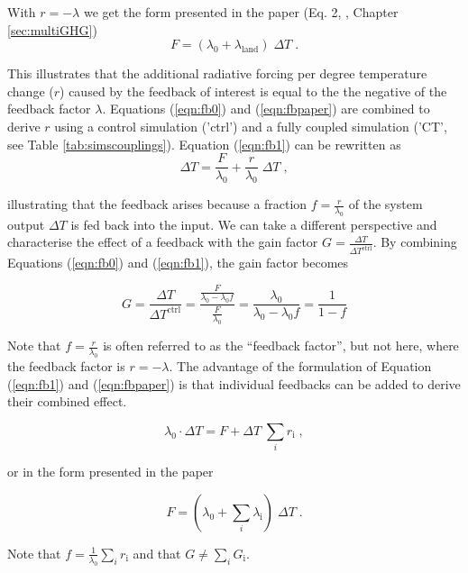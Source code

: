 With $r=-\lambda$ we get the form presented in the paper (Eq. 2, \citep{stocker13natcc}, Chapter \ref{sec:multiGHG})
\begin{equation}
  F = ( \lambda_0 + \lambda_{\text{land}}) \; \Delta T \;.
 \label{eqn:fbpaper}
 \end{equation}

This illustrates that the additional radiative forcing per degree temperature change ($r$) caused by the feedback of interest is equal to the the negative of the feedback factor $\lambda$. Equations (\ref{eqn:fb0}) and (\ref{eqn:fbpaper}) are combined to derive  $r$ using a control simulation ('ctrl') and a fully coupled simulation ('CT', see Table \ref{tab:simscouplings}). Equation (\ref{eqn:fb1}) can be rewritten as
 \begin{equation}
   \Delta T = \frac{F}{\lambda_0} + \frac{r}{\lambda_0}\;\Delta T\;,
 \end{equation}

illustrating that the feedback arises because a fraction $f=\frac{r}{\lambda_0}$ of the system output $\Delta T$ is fed back into the input. We can take a different perspective and characterise the effect of a feedback with the gain factor $G=\frac{\Delta T}{\Delta T^{\text{ctrl}}}$. By combining Equations (\ref{eqn:fb0}) and (\ref{eqn:fb1}), the gain factor becomes

 \begin{equation} 
   G=\frac{\Delta T}{\Delta T^{\text{ctrl}}} = \frac{\frac{F}{\lambda_0-\lambda_0f}}{\frac{F}{\lambda_0}} = \frac{\lambda_0}{\lambda_0-\lambda_0f} = \frac{1}{1-f} 
 \end{equation}

Note that $f=\frac{r}{\lambda_0}$ is often referred to as the ``feedback factor'', but not here, where the feedback factor is $r = -\lambda$. The advantage of the formulation of Equation (\ref{eqn:fb1}) and (\ref{eqn:fbpaper}) is that individual feedbacks can be added to derive their combined effect. 
 
\begin{equation}
   \lambda_0 \cdot \Delta T = F + \Delta T \; \sum_i r_{\text{i}}\;,
 \end{equation}
 
or in the form presented in the paper
 
\begin{equation}
   F = ( \lambda_0 + \sum_i \lambda_{\text{i}} ) \; \Delta T\;.
 \end{equation}
 
Note that $f=\frac{1}{\lambda_0}\sum_i r_{\text{i}}$ and that $G\neq\sum_i G_{\text{i}}$.

